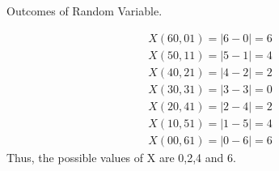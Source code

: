 \documentclass{article}
\begin{document}
\begin{enumerate}[label=13.\arabic{enumi}.\arabic{enumii}]
	\begin{table}[h]
	\centering
	
	\caption{Outcomes of Random Variable.}
	\label{tables:table4}
	\end{table}
	
\begin{align}
X(60,01) = |6-0| = 6\\
X(50,11) = |5-1| = 4\\
X(40,21) = |4-2| = 2\\
X(30,31) = |3-3| = 0\\
X(20,41) = |2-4| = 2\\
X(10,51) = |1-5| = 4\\
X(00,61) = |0-6| = 6
\end{align}
Thus, the possible values of X are 0,2,4 and 6.
\end{enumerate}
\end{document}

